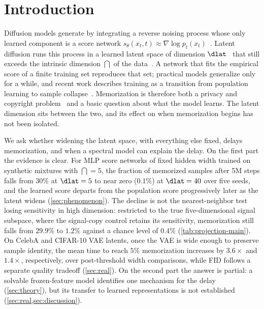 \section{Introduction}
\label{sec:intro}

Diffusion models generate by integrating a reverse noising process whose only learned component is a score network $s_\theta(x_t,t)\approx\nabla\log p_t(x_t)$~\citep{ho2020denoising,song2021scoresde,karras2022elucidating}. Latent diffusion runs this process in a learned latent space of dimension $\dlat$~\citep{rombach2022highresolution,esser2024sd3} that still exceeds the intrinsic dimension $\dint$ of the data~\citep{stanczuk2024manifold,kamkari2024geometric}. A network that fits the empirical score of a finite training set reproduces that set; practical models generalize only for a while, and recent work describes training as a transition from population learning to sample collapse~\citep{yi2023generalization,biroli2024dynamical,bonnaire2025}. Memorization is therefore both a privacy and copyright problem~\citep{carlini2019secret,somepalli2023diffusion,carlini2023extracting} and a basic question about what the model learns. The latent dimension sits between the two, and its effect on when memorization begins has not been isolated.

We ask whether widening the latent space, with everything else fixed, delays memorization, and when a spectral model can explain the delay. On the first part the evidence is clear. For MLP score networks of fixed hidden width trained on synthetic mixtures with $\dint=5$, the fraction of memorized samples after 5M steps falls from $30\%$ at $\dlat=5$ to near zero ($0.1\%$) at $\dlat=40$ over five seeds, and the learned score departs from the population score progressively later as the latent widens (\cref{sec:phenomenon}). The decline is not the nearest-neighbor test losing sensitivity in high dimension: restricted to the true five-dimensional signal subspace, where the signal-copy control retains its sensitivity, memorization still falls from $29.9\%$ to $1.2\%$ against a chance level of $0.4\%$ (\cref{tab:projection-main}). On CelebA and CIFAR-10 VAE latents, once the VAE is wide enough to preserve sample identity, the mean time to reach $5\%$ memorization increases by $3.6\times$ and $1.4\times$, respectively, over post-threshold width comparisons, while FID follows a separate quality tradeoff (\cref{sec:real}). On the second part the answer is partial: a solvable frozen-feature model identifies one mechanism for the delay (\cref{sec:theory}), but its transfer to learned representations is not established (\cref{sec:real,sec:discussion}).

